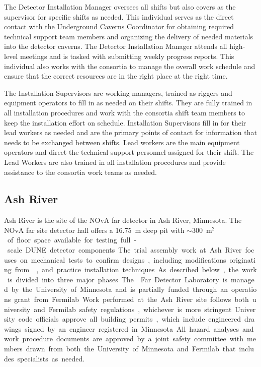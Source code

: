 The Detector Installation Manager oversees all shifts but also 
covers as the supervisor for specific shifts as needed.  This 
individual serves as the direct contact with the Underground 
Caverns Coordinator for obtaining required technical support
team members and organizing the delivery of needed materials 
into the detector caverns.  The Detector Installation Manager 
attends all high-level meetings and is tasked with submitting
weekly progress reports.  This individual also works with the 
 consortia to manage the overall work schedule 
and ensure that the correct resources are in the right place
at the right time. 
    
The Installation Supervisors are working managers, trained as 
riggers and equipment operators to fill in as needed on their 
shifts.  They are fully trained in all installation procedures
and work with the consortia shift team members to keep the 
installation effort on schedule.  Installation Supervisors 
fill in for their lead workers as needed and are the primary 
points of contact for information that needs to be exchanged 
between shifts.  Lead workers are the main equipment operators 
and direct the technical support personnel assigned for their 
shift.  The Lead Workers are also trained in all installation 
procedures and provide assistance to the consortia work teams 
as needed.  

\subsection{Ash River}

Ash River is the site of the NOvA far detector in Ash River,
Minnesota. The NOvA far site detector hall offers a \SI{16.75}{m} 
deep pit with $\sim$\SI{300}{m$^2$} of floor space available for 
testing full-scale DUNE detector components.  The trial assembly 
work at Ash River focuses on mechanical tests to confirm designs,
including modifications originating from , 
and practice installation techniques.  As described below, the 
work is divided into three major phases.  The  Far 
Detector Laboratory is managed by the University of Minnesota 
and is partially funded through an operations grant from 
Fermilab.  Work performed at the Ash River site follows both 
university and Fermilab safety regulations, whichever is more 
stringent. University code officials approve all building permits, 
which include engineered drawings signed by an engineer registered 
in Minnesota. All hazard analyses and work procedure documents are 
approved by a joint safety committee with members drawn from both 
the University of Minnesota and Fermilab that includes specialists 
as needed.

